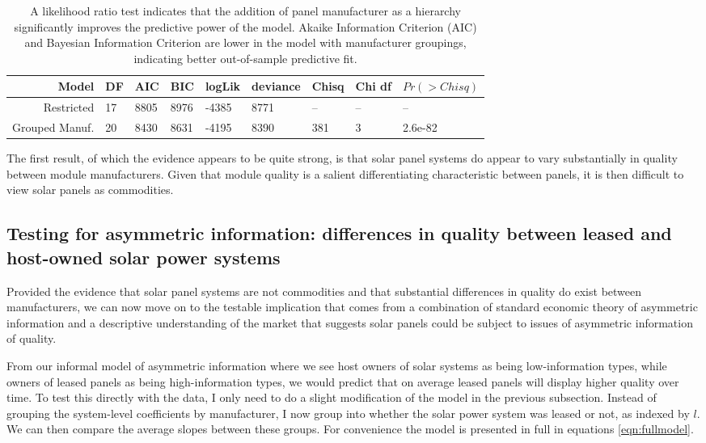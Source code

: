 \documentclass[a4paper]{article}
\begin{document}
\begin{table}
  \begin{tabular}{rllllllll}
  \toprule
    Model &  DF &   AIC &   BIC &  logLik &  deviance &  Chisq &  Chi df &  $Pr(>Chisq)$ \\
    \midrule
             Restricted &  17 &  8805 &  8976 &   -4385 &      8771 &     -- &      -- &          -- \\
    Grouped Manuf. &  20 &  8430 &  8631 &   -4195 &      8390 &    381 &       3 &     2.6e-82 \\
  \bottomrule
  \end{tabular}
  \label{tbl:lm_commodity}
  \caption{A likelihood ratio test indicates that the addition of panel manufacturer as a hierarchy significantly improves the predictive power of the model. Akaike Information Criterion (AIC) and Bayesian Information Criterion are lower in the model with manufacturer groupings, indicating better out-of-sample predictive fit.}
\end{table}

The first result, of which the evidence appears to be quite strong, is that solar panel systems do appear to vary substantially in quality between module manufacturers. Given that module quality is a salient differentiating characteristic between panels, it is then difficult to view solar panels as commodities.

\subsection{Testing for asymmetric information: differences in quality between leased and host-owned solar power systems}

Provided the evidence that solar panel systems are not commodities and that substantial differences in quality do exist between manufacturers, we can now move on to the testable implication that comes from a combination of standard economic theory of asymmetric information and a descriptive understanding of the market that suggests solar panels could be subject to issues of asymmetric information of quality.

From our informal model of asymmetric information where we see host owners of solar systems as being low-information types, while owners of leased panels as being high-information types, we would predict that on average leased panels will display higher quality over time. To test this directly with the data, I only need to do a slight modification of the model in the previous subsection. Instead of grouping the system-level coefficients by manufacturer, I now group into whether the solar power system was leased or not, as indexed by $l$. We can then compare the average slopes between these groups. For convenience the model is presented in full in equations \ref{eqn:fullmodel}.
\end{document}
